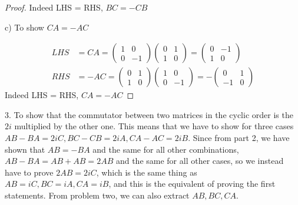\documentclass{article}
\begin{document}
\begin{proof}
Indeed LHS = RHS, $BC = - CB$

c) To show $CA = - AC$

\begin{align}
LHS &= CA = \begin{pmatrix}
1 & 0 \\ 0 & -1
\end{pmatrix} \begin{pmatrix}
0 & 1 \\ 1 & 0
\end{pmatrix} = \begin{pmatrix}
0 & -1 \\ 1 & 0
\end{pmatrix} \\
RHS &= -AC = \begin{pmatrix}
0 & 1 \\ 1 & 0
\end{pmatrix}\begin{pmatrix}
1 & 0 \\ 0 & -1
\end{pmatrix} = - \begin{pmatrix}
0 & 1 \\ -1 & 0
\end{pmatrix}
\end{align}
Indeed LHS = RHS, $CA = - AC$
\end{proof}

3. To show that the commutator between two matrices in the cyclic order is the $2i$ multiplied by the other one. This means that we have to show for three cases $AB - BA = 2iC, BC - CB = 2iA, CA - AC = 2iB$. Since from part 2, we have shown that $AB = - BA$ and the same for all other combinations, $AB - BA = AB + AB = 2AB$ and the same for all other cases, so we instead have to prove $2AB = 2iC$, which is the same thing as $AB = iC, BC = iA, CA = iB$, and this is the equivalent of proving the first statements. From problem two, we can also extract $AB, BC, CA$.
\end{document}
